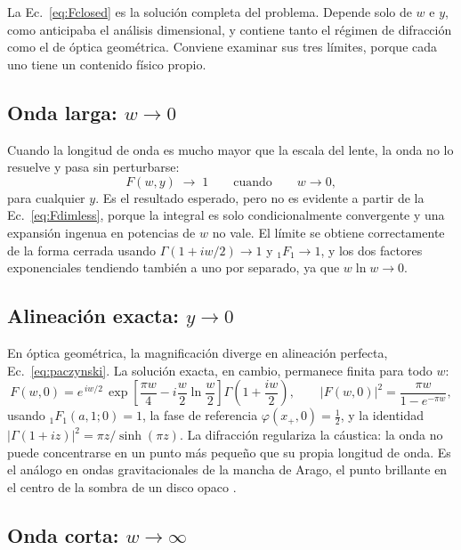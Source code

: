 \documentclass[11pt,a4paper,openany]{book}
\begin{document}
La Ec.~\eqref{eq:Fclosed} es la soluci\'on completa del problema. Depende solo
de $w$ e $y$, como anticipaba el an\'alisis dimensional, y contiene tanto el
r\'egimen de difracci\'on como el de \'optica geom\'etrica. Conviene examinar
sus tres l\'imites, porque cada uno tiene un contenido f\'isico propio.

\subsection*{Onda larga: $w\to0$}

Cuando la longitud de onda es mucho mayor que la escala del lente, la onda no
lo resuelve y pasa sin perturbarse:
\begin{equation}
  F(w,y)\;\longrightarrow\;1
  \qquad\text{cuando}\qquad w\to0 ,
  \label{eq:lowlimit}
\end{equation}
para cualquier $y$. Es el resultado esperado, pero no es evidente a partir de
la Ec.~\eqref{eq:Fdimless}, porque la integral es solo condicionalmente
convergente y una expansi\'on ingenua en potencias de $w$ no vale. El
l\'imite se obtiene correctamente de la forma cerrada usando
$\Gamma(1+iw/2)\to1$ y ${}_1F_1\to1$, y los dos factores exponenciales
tendiendo tambi\'en a uno por separado, ya que $w\ln w\to0$.

\subsection*{Alineaci\'on exacta: $y\to0$}

En \'optica geom\'etrica, la magnificaci\'on diverge en alineaci\'on perfecta,
Ec.~\eqref{eq:paczynski}. La soluci\'on exacta, en cambio, permanece finita
para todo $w$:
\begin{equation}
  F(w,0)=e^{\,iw/2}\,
  \exp\!\left[\frac{\pi w}{4}-i\frac{w}{2}\ln\frac{w}{2}\right]
  \Gamma\!\left(1+\frac{iw}{2}\right) ,
  \qquad
  |F(w,0)|^{2}=\frac{\pi w}{1-e^{-\pi w}} ,
  \label{eq:Fzero}
\end{equation}
usando ${}_1F_1(a,1;0)=1$, la fase de referencia
$\varphi(x_+,0)=\tfrac12$, y la identidad
$|\Gamma(1+iz)|^{2}=\pi z/\sinh(\pi z)$. La difracci\'on regulariza la
c\'austica: la onda no puede concentrarse en un punto m\'as peque\~no que su
propia longitud de onda. Es el an\'alogo en ondas gravitacionales de la mancha
de Arago, el punto brillante en el centro de la sombra de un disco opaco
\citep{Deguchi1986}.

\subsection*{Onda corta: $w\to\infty$}
\end{document}

